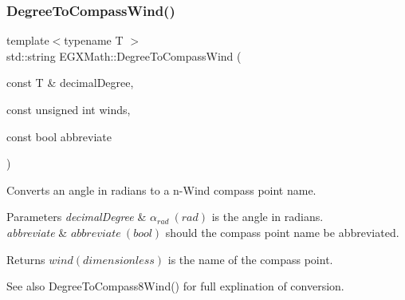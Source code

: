 \subsubsection{\texorpdfstring{Degree\+To\+Compass\+Wind()}{DegreeToCompassWind()}}
{\footnotesize\ttfamily template$<$typename T $>$ \\
std\+::string E\+G\+X\+Math\+::\+Degree\+To\+Compass\+Wind (\begin{DoxyParamCaption}\item[{const T \&}]{decimal\+Degree,  }\item[{const unsigned int}]{winds,  }\item[{const bool}]{abbreviate }\end{DoxyParamCaption})}



Converts an angle in radians to a n-\/\+Wind compass point name. 


\begin{DoxyParams}{Parameters}
{\em decimal\+Degree} & $\alpha_{rad}\ (rad)$ is the angle in radians. \\
\hline
{\em abbreviate} & $abbreviate\ (bool)$ should the compass point name be abbreviated. \\
\hline
\end{DoxyParams}
\begin{DoxyReturn}{Returns}
$wind (dimensionless)$ is the name of the compass point. 
\end{DoxyReturn}
\begin{DoxySeeAlso}{See also}
Degree\+To\+Compass8\+Wind() for full explination of conversion. 
\end{DoxySeeAlso}
